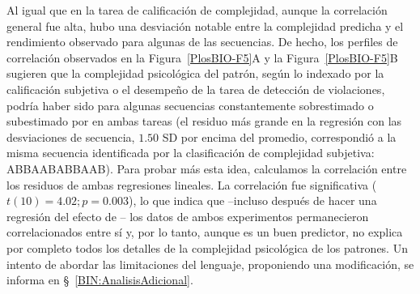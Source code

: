 
Al igual que en la tarea de calificación de complejidad, aunque la correlación general fue alta, hubo una desviación notable entre la complejidad predicha y el rendimiento observado para algunas de las secuencias. De hecho, los perfiles de correlación observados en la Figura~\ref{PlosBIO-F5}A y la Figura~\ref{PlosBIO-F5}B sugieren que la complejidad psicológica del patrón, según lo indexado por la calificación subjetiva o el desempeño de la tarea de detección de violaciones, podría haber sido para algunas secuencias constantemente sobrestimado o subestimado por \mdlbin en ambas tareas (el residuo más grande en la regresión con las desviaciones de secuencia, $1.50$ SD por encima del promedio, correspondió a la misma secuencia identificada por la clasificación de complejidad subjetiva: ABBAABABBAAB). Para probar más esta idea, calculamos la correlación entre los residuos de ambas regresiones lineales. La correlación fue significativa ($t (10) = 4.02; p = 0.003$), lo que indica que --incluso después de hacer una regresión del efecto de \mdlbin-- los datos de ambos experimentos permanecieron correlacionados entre sí y, por lo tanto, aunque \mdlbin es un buen predictor, no explica por completo todos los detalles de la complejidad psicológica de los patrones. Un intento de abordar las limitaciones del lenguaje, proponiendo una modificación, se informa en \S~\ref{BIN:AnalisisAdicional}.


